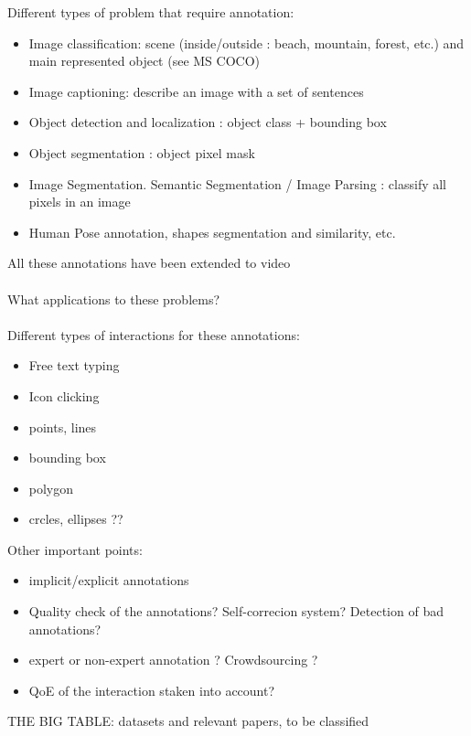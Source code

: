 Different types of problem that require annotation:
\begin{itemize}
	\item Image classification: scene (inside/outside : beach, mountain, forest, etc.) and main represented object (see MS COCO)
	\item Image captioning: describe an image with a set of sentences
	\item Object detection and localization : object class + bounding box
	\item Object segmentation : object pixel mask
	\item Image Segmentation. Semantic Segmentation / Image Parsing : classify all pixels in an image
	\item Human Pose annotation, shapes segmentation and similarity, etc.
\end{itemize}
All these annotations have been extended to video \\ \\

What applications to these problems? \\ \\

Different types of interactions for these annotations:

\begin{itemize}
	\item Free text typing
	\item Icon clicking
	\item points, lines
	\item bounding box
	\item polygon
	\item crcles, ellipses ??
\end{itemize}

Other important points:

\begin{itemize}
	\item implicit/explicit annotations
	\item Quality check of the annotations? Self-correcion system? Detection of bad annotations?
	\item expert or non-expert annotation ? Crowdsourcing ?
	\item QoE of the interaction staken into account?
\end{itemize}

THE BIG TABLE: datasets and relevant papers, to be classified


